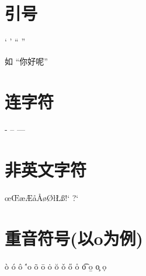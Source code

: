 \documentclass{article} %
\begin{document}
	\section{引号} %
	` ' `` ''
	
	如 ``你好呢''
	
	\section{连字符}
	- -- ---
	
	\section{非英文字符}
	\oe \OE \ae \AE \aa \AA \o \O \l \L \ss \SS !` ?`
	
	\section{重音符号(以o为例)}
	\`o \'o \^o \''o \~o \=o \.o \u{o} \v{o} \H{o} \r{o} \t{o} \b{o} \c{o} \d{o}
		
\end{document}
